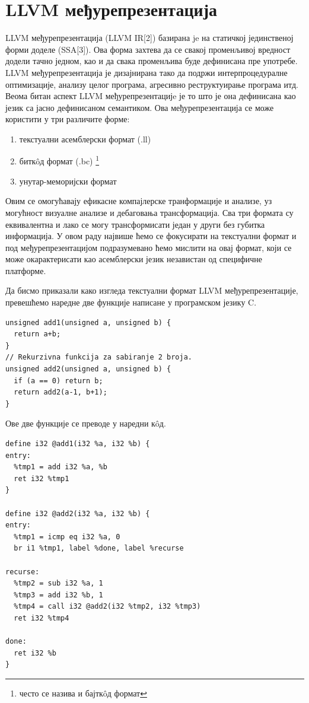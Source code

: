 \documentclass[12pt,oneside]{memoir}
\begin{document}
\section{LLVM међурепрезентација}
LLVM међурепрезентација (LLVM IR[2]) базирана je на статичкој 
јединственој форми доделе (SSA[3]).
Ова форма захтева да се свакој променљивој вредност додели тачно једном, као и да
свака променљива буде дефинисана пре употребе.
LLVM међурепрезентација је дизајнирана тако да подржи интерпроцедуралне оптимизације,
анализу целог програма, агресивно реструктуирање програма итд.
Веома битан аспект LLVM међурепрезентацијe је то што је она дефинисана као 
језик са јасно дефинисаном семантиком.
Ова међурепрезентација се може користити у три различите форме: 
\begin{enumerate}
\item текстуални асемблерски формат (.ll)
\item битк\^{o}д  формат (.bc) \footnote{често се назива и бајтк\^{o}д формат}
\item унутар-меморијски формат 
\end{enumerate} 
Овим се омогућавају ефикасне компајлерске транформације и анализе, уз могућност
визуалне анализе и дебаговања трансформација. 
Сва три формата су еквивалентна и лако се могу трансформисати један у други без
губитка информација. 
У овом раду највише ћемо се фокусирати на текстуални формат и под међурепрезентацијом
подразумевано ћемо мислити на овај формат, који се може окарактерисати као асемблерски 
језик независтан од специфичне платформе.

Да бисмо приказали како изгледа текстуални формат LLVM међурепрезентације,
превешћемо наредне две функције написане у програмском језику C.
\begin{lstlisting}[frame=single]
unsigned add1(unsigned a, unsigned b) {
  return a+b;
}
// Rekurzivna funkcija za sabiranje 2 broja.
unsigned add2(unsigned a, unsigned b) {
  if (a == 0) return b;
  return add2(a-1, b+1);
}
\end{lstlisting}
\pagebreak
Ове две функције се преводе у наредни к\^{o}д.
\begin{lstlisting}[frame=single]
define i32 @add1(i32 %a, i32 %b) {
entry:
  %tmp1 = add i32 %a, %b
  ret i32 %tmp1
}

define i32 @add2(i32 %a, i32 %b) {
entry:
  %tmp1 = icmp eq i32 %a, 0
  br i1 %tmp1, label %done, label %recurse

recurse:
  %tmp2 = sub i32 %a, 1
  %tmp3 = add i32 %b, 1
  %tmp4 = call i32 @add2(i32 %tmp2, i32 %tmp3)
  ret i32 %tmp4

done:
  ret i32 %b
}
\end{lstlisting}
\end{document}
